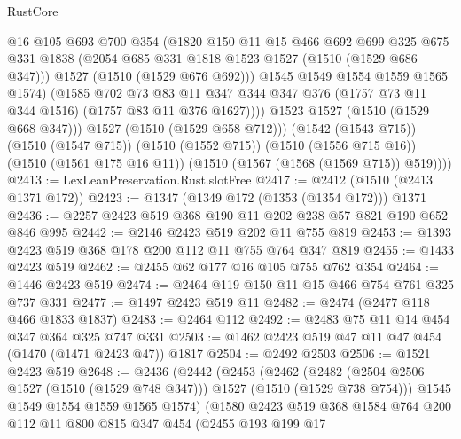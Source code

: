 \begin{lexlean}{RustCore}
\begin{coremodule}
                  @16
                  @105
                  @693
                  @700
                  @354
                  (@1820
                    @150
                    @11
                    @15
                    @466
                    @692
                    @699
                    @325
                    @675
                    @331
                    @1838
                    (@2054 @685 @331 @1818 @1523 @1527 (@1510 (@1529 @686 @347)))
                    @1527
                    (@1510 (@1529 @676 @692)))
                  @1545
                  @1549
                  @1554
                  @1559
                  @1565
                  @1574)
                (@1585
                  @702
                  @73
                  @83
                  @11
                  @347
                  @344
                  @347
                  @376
                  (@1757 @73 @11 @344 @1516)
                  (@1757 @83 @11 @376 @1627))))
            @1523
            @1527
            (@1510 (@1529 @668 @347)))
          @1527
          (@1510 (@1529 @658 @712)))
        (@1542 (@1543 @715))
        (@1510 (@1547 @715))
        (@1510 (@1552 @715))
        (@1510 (@1556 @715 @16))
        (@1510 (@1561 @175 @16 @11))
        (@1510 (@1567 (@1568 (@1569 @715)) @519))))
@2413 := LexLeanPreservation.Rust.slotFree
@2417 := @2412 (@1510 (@2413 @1371 @172))
@2423 := @1347 (@1349 @172 (@1353 (@1354 @172))) @1371
@2436 := @2257 @2423 @519 @368 @190 @11 @202 @238 @57 @821 @190 @652 @846 @995
@2442 := @2146 @2423 @519 @202 @11 @755 @819
@2453 := @1393 @2423 @519 @368 @178 @200 @112 @11 @755 @764 @347 @819
@2455 := @1433 @2423 @519
@2462 := @2455 @62 @177 @16 @105 @755 @762 @354
@2464 := @1446 @2423 @519
@2474 := @2464 @119 @150 @11 @15 @466 @754 @761 @325 @737 @331
@2477 := @1497 @2423 @519 @11
@2482 := @2474 (@2477 @118 @466 @1833 @1837)
@2483 := @2464 @112
@2492 := @2483 @75 @11 @14 @454 @347 @364 @325 @747 @331
@2503 := @1462 @2423 @519 @47 @11 @47 @454 (@1470 (@1471 @2423 @47)) @1817
@2504 := @2492 @2503
@2506 := @1521 @2423 @519
@2648 := @2436
    (@2442
      (@2453
        (@2462
          (@2482 (@2504 @2506 @1527 (@1510 (@1529 @748 @347))) @1527 (@1510 (@1529 @738 @754)))
          @1545
          @1549
          @1554
          @1559
          @1565
          @1574)
        (@1580
          @2423
          @519
          @368
          @1584
          @764
          @200
          @112
          @11
          @800
          @815
          @347
          @454
          (@2455
            @193
            @199
            @17

\end{coremodule}
\end{lexlean}
